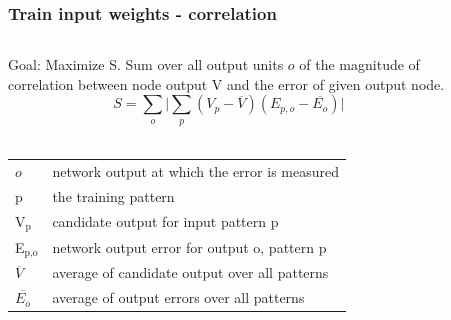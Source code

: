 \documentclass[presentation]{beamer}
\begin{document}
\begin{frame}
  \frametitle{Train input weights - correlation}
	\begin{columns}[t]
		\begin{column}[t]{0.5\textwidth}
      Goal: Maximize S. Sum over all output units $\mathit{o}$ of the
        magnitude of correlation between node output V and the error of given
        output node.
      $$ S = \sum_{o} \lvert \sum_{p} (V_{p} - \overline{V}) (E_{p,o} - \overline{E_{o}}) \rvert $$
     \\  
      \begin{center}
        \begin{tabular}{ll}
          \(\mathit{o}\) & \tiny{network output at which the error is measured} \\
          p & \tiny{the training pattern} \\
          V\(_{\text{p}}\) & \tiny{candidate output for input pattern p}   \\
          E\(_{\text{p,o}}\) & \tiny{network output error for output o, pattern p} \\
          \(\overline{V}\) & \tiny{average of candidate output over all patterns} \\
          \(\overline{E_{o}}\) & \tiny{average of output errors over all patterns} \\
        \end{tabular}
      \end{center}
		\end{column}
		\begin{column}{0.5\textwidth}
      \begin{figure}
        \centering

\end{figure}
\end{column}
\end{columns}
\end{frame}
\end{document}
